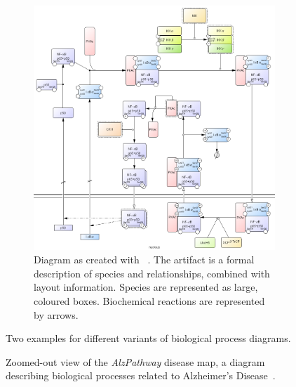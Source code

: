\documentclass[
	fontsize=10pt, %
	twoside=true, %
	secnumdepth=1, %
  toc=indentunnumbered %
]{kaobook}
\begin{document}
\begin{figure}[h]
\begin{subfigure}{0.4\textwidth}
    \includegraphics[width=\textwidth]{NF-kB-mechanism/CellDesigner.png}
    \caption{Diagram as created with
      ~\cite{_CellDesignerProcessDiagram_}. The artifact is a formal description of
      species and relationships, combined with layout information. 
      Species are represented as large, coloured boxes.
      Biochemical reactions are represented by arrows. }%
    \label{fig:process-diagram-old-vs-new:celldesigner}
  \end{subfigure}
  \caption{
    Two examples for different variants of biological process diagrams.
  }%
  \label{fig:process-diagram-old-vs-new}
\end{figure}


\begin{figure}[h]
  \centering
  \caption{Zoomed-out view of the
    \textit{AlzPathway} disease map, a diagram describing biological processes
    related to Alzheimer's
    Disease~\cite{ostaszewski_AlzPathwayRegorganisationSteps_2021}.
  }%
  \label{fig:disease-map-example}
\end{figure}
\end{document}
